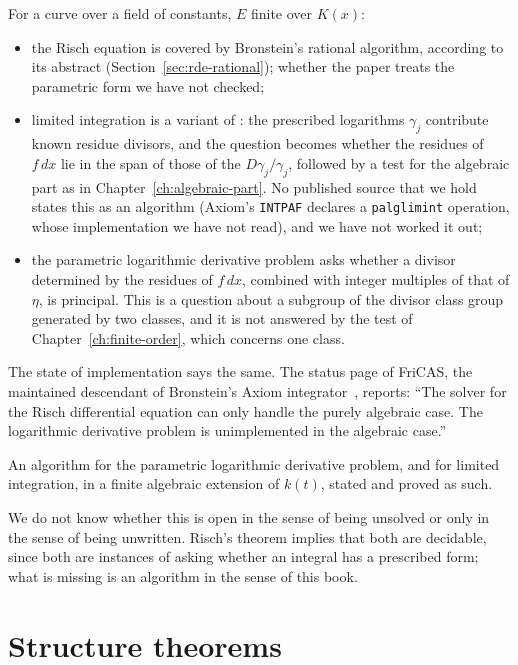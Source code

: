 For a curve over a field of constants, $E$ finite over $K(x)$:
\begin{itemize}
\item the Risch equation is covered by Bronstein's rational algorithm,
  according to its abstract (Section~\ref{sec:rde-rational}); whether the
  paper treats the parametric form we have not checked;
\item limited integration is a variant of : the
  prescribed logarithms $\gamma_j$ contribute known residue divisors, and
  the question becomes whether the residues of $f\,dx$ lie in the span of
  those of the $D\gamma_j/\gamma_j$, followed by a test for the algebraic
  part as in Chapter~\ref{ch:algebraic-part}. No published source that we hold
  states this as an algorithm (Axiom's \texttt{INTPAF} declares a
  \texttt{palglimint} operation, whose implementation we have not read), and
  we have not worked it out;
\item the parametric logarithmic derivative problem asks whether a divisor
  determined by the residues of $f\,dx$, combined with integer multiples of
  that of $\eta$, is principal. This is a question about a subgroup of the
  divisor class group generated by two classes, and it is not answered by
  the test of Chapter~\ref{ch:finite-order}, which concerns one class.
\end{itemize}

The state of implementation says the same. The status page of FriCAS, the
maintained descendant of Bronstein's Axiom
integrator~\cite{fricas2022}, reports: ``The solver for the Risch
differential equation can only handle the purely algebraic case. The
logarithmic derivative problem is unimplemented in the algebraic case.''

\begin{openproblem}
An algorithm for the parametric logarithmic derivative problem, and for
limited integration, in a finite algebraic extension of $k(t)$, stated and
proved as such.
\end{openproblem}

We do not know whether this is open in the sense of being unsolved or only
in the sense of being unwritten. Risch's theorem implies that both are
decidable, since both are instances of asking whether an integral has a
prescribed form; what is missing is an algorithm in the sense of this book.

\section{Structure theorems}\label{sec:param-structure}

